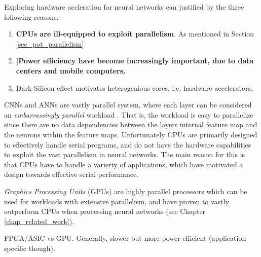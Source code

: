 Exploring hardware accleration for neural networks can justified by the three following reasons:
 
\begin{enumerate}
    \item \textbf{CPUs are ill-equipped to exploit parallelism}.
    As mentioned in Section \ref{sec_pot_parallelism} 
    \item \textbf{]Power efficiency have become increasingly important, due to data centers and mobile computers.}
    
    \item Dark Silicon effect motivates heterogenious cores, i.e. hardware accelerators.
\end{enumerate}


CNNs and ANNs are vastly parallel system, where each layer can be considered an \textit{embarrassingly parallel} workload \cite{PARALLEL_STUFF}. That is, the workload is easy to parallelize since there are no data dependencies between the layers internal feature map and the neurons within the feature maps. Unfortunately CPUs are primarily designed to effectively handle serial programs, and do not have the hardware capabilities to exploit the vast parallelism in neural networks. The main reason for this is that CPUs have to handle a varierty of applications, which have motivated a design towards effective serial performance. 

\textit{Graphics Processing Units} (GPUs) are highly parallel processors which can be used for workloads with extensive parallelism, and have proven to vastly outperform CPUs when processing neural networks (see Chapter \ref{chap_related_work}). 




FPGA/ASIC vs GPU. Generally, slower but more power efficient (application specific though).

